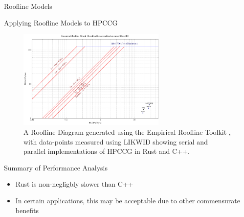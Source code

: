 \documentclass[10pt,aspectratio=169]{beamer}
\begin{document}






\begin{frame}{Roofline Models}
\end{frame}

\begin{frame}{Applying Roofline Models to HPCCG}
    \begin{figure}[H]
        \includegraphics[width=0.65\textwidth]{images/Athena_ERT_generated_roofline.pdf}
        \caption{A Roofline Diagram generated using the Empirical Roofline Toolkit \cite{yangEmpiricalRooflineMethodology2018}, with data-points measured using LIKWID \cite{treibigLIKWIDLightweightPerformance2012} showing serial and parallel implementations of HPCCG in Rust and C++.}
        \label{fig:intelvtune}
    \end{figure}
\end{frame}

\begin{frame}{Summary of Performance Analysis}
    \begin{itemize}
        \item Rust is non-negligbly slower than C++
        \item In certain applications, this may be acceptable due to other commensurate benefits
    \end{itemize}
\end{frame}
\end{document}
